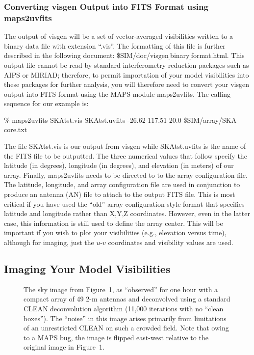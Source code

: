 \documentclass[12pt,psfig]{article}
\begin{document}
\subsubsection{Converting {\sf visgen} Output into FITS Format using 
{\sf maps2uvfits}\protect\label{maps2uvfits}}
%
The output of {\sf visgen} will be a set of vector-averaged visibilities
written to a binary data file with extension ``.vis''. The formatting
of this file is further described in the following document:
\$SIM/doc/visgen$\underline~$binary$\underline~$format.html. This
output file cannot be read by standard interferometry
reduction packages such as AIPS or MIRIAD; therefore, 
to permit importation of your
model visibilities into these
packages for further analysis, you will therefore 
need to convert your {\sf visgen}
output into FITS format using the MAPS module {\sf maps2uvfits}. The
calling sequence for our example is:

\bigskip

\noindent \% {\sf maps2uvfits} SKAtst.vis SKAtst.uvfits -26.62 117.51 20.0
\$SIM/array/SKA$\underline~$core.txt

\bigskip

\noindent The file {\sf SKAtst.vis} is our output from {\sf visgen} while
SKAtst.uvfits is the name of the FITS file to be outputted. The three
numerical values that follow specify the latitude (in degrees),
longitude (in degrees), and elevation (in meters) of our
array. Finally, {\sf maps2uvfits} needs to be directed to to the  
array configuration file. The latitude, longitude, and array
configuration file are used in conjunction to produce an antenna (AN)
file to attach to the output FITS file. This is most critical if you
have used the ``old'' array configuration style format that specifies
latitude and longitude rather than X,Y,Z coordinates. However, even in
the latter case, this information is still used to define the array center.
This will be important if you wish to plot your visibilities (e.g.,
elevation versus time), although for imaging, just the $u$-$v$ coordinates and
visibility values are used.


\subsection{Imaging Your Model Visibilities}
%

\begin{figure}
\vspace{2in}

\caption{The sky image from Figure~1, as ``observed'' for
one hour with a
compact array of 49 2-m antennas and deconvolved using a standard
CLEAN deconvolution algorithm (11,000 iterations with no ``clean boxes''). 
The ``noise'' in this image arises primarily 
from limitations of an unrestricted CLEAN on such a crowded field. Note that
owing to a MAPS bug, the image is flipped east-west relative to the
original image in Figure~1.}
\end{figure}
\end{document}
